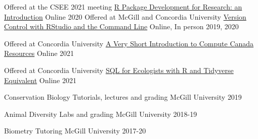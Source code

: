 

\begin{cventries}

  \cventry
    {Offered at the CSEE 2021 meeting} %
    {\href{https://github.com/VLucet/R_pkg_dev_for_research_CSEE_2021}{R Package Development for Research: an Introduction}} %
    {Online} %
    {2020} %
    {}
  \cventry
    {Offered at McGill and Concordia University} %
    {\href{https://github.com/VLucet/git-and-github-with-r-workshop}{Version Control with RStudio and the Command Line}} %
    {Online, In person} %
    {2019, 2020} %
    {}

  \cventry
    {Offered at Concordia University} %
    {\href{https://github.com/VLucet/ComputeCanada-short-intro}{A Very Short Introduction to Compute Canada Resources}} %
    {Online} %
    {2021} %
    {}  

  \cventry
    {Offered at Concordia University} %
    {\href{https://github.com/VLucet/sql-workshop-for-ecologists}{SQL for Ecologists with R and Tidyverse Equivalent}} %
    {Online} %
    {2021} %
    {}

\end{cventries}


\begin{cvhonors}

      \cvhonor
        {Conservation Biology} %
        {Tutorials, lectures and grading} %
        {McGill University} %
        {2019} %
    
      \cvhonor
        {Animal Diversity} %
        {Labs and grading} %
        {McGill University} %
        {2018-19} %
    
    \cvhonor
        {Biometry} %
        {Tutoring} %
        {McGill University} %
        {2017-20} %

\end{cvhonors}
    